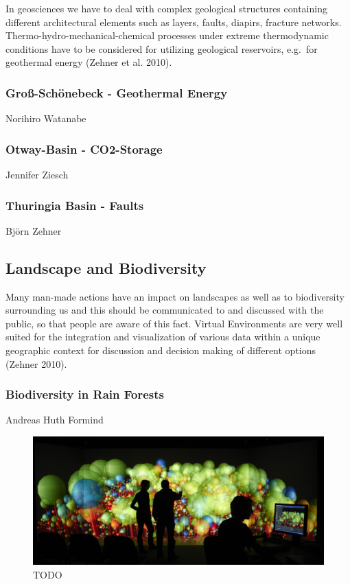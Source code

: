 In geosciences we have to deal with complex geological structures
containing different architectural elements such as layers, faults,
diapirs, fracture networks. Thermo-hydro-mechanical-chemical processes
under extreme thermodynamic conditions have to be considered for
utilizing geological reservoirs, e.g.~for geothermal energy (Zehner et
al. 2010).

\subsubsection{Gro{\ss}-Sch\"onebeck - Geothermal Energy}
\label{grouxdf-schuxf6nebeck---geothermal-energy}

Norihiro Watanabe

\subsubsection{Otway-Basin - CO2-Storage}
\label{otway-basin---co2-storage}

Jennifer Ziesch

\subsubsection{Thuringia Basin - Faults}
\label{thuringia-basin---faults}

Bj\"orn Zehner

\subsection{Landscape and Biodiversity}
\label{landscape-and-biodiversity}

Many man-made actions have an impact on landscapes as well as to
biodiversity surrounding us and this should be communicated to and
discussed with the public, so that people are aware of this fact.
Virtual Environments are very well suited for the integration and
visualization of various data within a unique geographic context for
discussion and decision making of different options (Zehner 2010).

\subsubsection{Biodiversity in Rain Forests}
\label{biodiversity-in-rain-forests}

Andreas Huth Formind \cite{kohler:98}

\begin{figure}
  \includegraphics[width=\linewidth]{images/biodiversity.jpg}
\caption{TODO}
\label{fig:biodiversity}
\end{figure}

